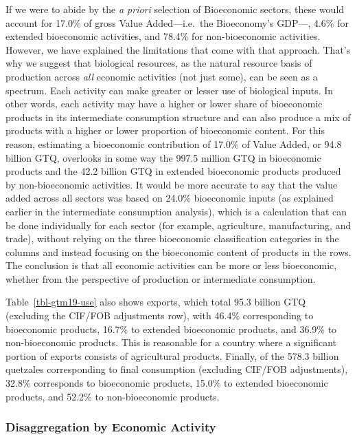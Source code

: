 \documentclass[
  letterpaper,
  DIV=11,
  numbers=noendperiod]{scrartcl}
\begin{document}
If we were to abide by the \emph{a priori} selection of Bioeconomic
sectors, these would account for 17.0\% of gross Value Added---i.e.~the
Bioeconomy's GDP---, 4.6\% for extended bioeconomic activities, and
78.4\% for non-bioeconomic activities. However, we have explained the
limitations that come with that approach. That's why we suggest that
biological resources, as the natural resource basis of production across
\emph{all} economic activities (not just some), can be seen as a
spectrum. Each activity can make greater or lesser use of biological
inputs. In other words, each activity may have a higher or lower share
of bioeconomic products in its intermediate consumption structure and
can also produce a mix of products with a higher or lower proportion of
bioeconomic content. For this reason, estimating a bioeconomic
contribution of 17.0\% of Value Added, or 94.8 billion GTQ, overlooks in
some way the 997.5 million GTQ in bioeconomic products and the 42.2
billion GTQ in extended bioeconomic products produced by non-bioeconomic
activities. It would be more accurate to say that the value added across
all sectors was based on 24.0\% bioeconomic inputs (as explained earlier
in the intermediate consumption analysis), which is a calculation that
can be done individually for each sector (for example, agriculture,
manufacturing, and trade), without relying on the three bioeconomic
classification categories in the columns and instead focusing on the
bioeconomic content of products in the rows. The conclusion is that all
economic activities can be more or less bioeconomic, whether from the
perspective of production or intermediate consumption.

Table~\ref{tbl-gtm19-use} also shows exports, which total 95.3 billion
GTQ (excluding the CIF/FOB adjustments row), with 46.4\% corresponding
to bioeconomic products, 16.7\% to extended bioeconomic products, and
36.9\% to non-bioeconomic products. This is reasonable for a country
where a significant portion of exports consists of agricultural
products. Finally, of the 578.3 billion quetzales corresponding to final
consumption (excluding CIF/FOB adjustments), 32.8\% corresponds to
bioeconomic products, 15.0\% to extended bioeconomic products, and
52.2\% to non-bioeconomic products.

\subsubsection{Disaggregation by Economic
Activity}\label{disaggregation-by-economic-activity}
\end{document}
